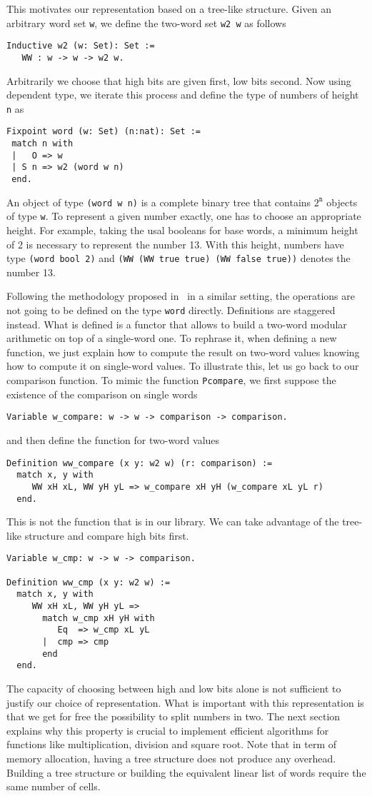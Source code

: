 This motivates our representation based on a tree-like structure. Given an arbitrary word set {\tt w}, we define
the two-word set {\tt w2 w} as follows 
\begin{verbatim}
Inductive w2 (w: Set): Set :=  
   WW : w -> w -> w2 w.
\end{verbatim}
Arbitrarily we choose that high bits are given first, low bits
second. Now using dependent type, we iterate this process and define
the type of numbers of height {\tt n} as
\begin{verbatim}
Fixpoint word (w: Set) (n:nat): Set :=
 match n with
 |   O => w
 | S n => w2 (word w n)
 end.
\end{verbatim}
An object of type {\tt (word w n)} is a complete binary tree that
contains $2^\texttt{n}$ objects of type {\tt w}.
To represent a given number exactly, one has to choose an appropriate height.
For example, taking the usal booleans for base words, a minimum
height of 2 is necessary to represent the number 13. With this height, 
numbers have type {\tt (word bool 2)} and 
{\tt (WW (WW true true) (WW false true))} denotes the number 13.

Following the methodology proposed in~\cite{GreMa} in a similar setting, 
the operations are not going to be defined on the type {\tt word} directly.
Definitions are staggered instead. What is defined is a functor that 
allows to build a two-word modular arithmetic on top of a single-word one. To rephrase it,
when defining a new function, we just explain how to compute the 
result on two-word values knowing how to compute it on single-word values.
To illustrate this, let us go back to our comparison function. 
To mimic the function {\tt Pcompare}, we first suppose the existence
of the comparison on single words
\begin{verbatim}
Variable w_compare: w -> w -> comparison -> comparison.
\end{verbatim}
and then define the function for two-word values
\begin{verbatim}
Definition ww_compare (x y: w2 w) (r: comparison) :=
  match x, y with
     WW xH xL, WW yH yL => w_compare xH yH (w_compare xL yL r) 
  end.
\end{verbatim}
This is not the function that is in our library. We can take 
advantage of the tree-like structure and compare high bits first.  
\begin{verbatim}
Variable w_cmp: w -> w -> comparison.

Definition ww_cmp (x y: w2 w) :=
  match x, y with
     WW xH xL, WW yH yL => 
       match w_cmp xH yH with 
          Eq  => w_cmp xL yL
       |  cmp => cmp
       end
  end. 
\end{verbatim}
The capacity of choosing between high and low bits alone is
not sufficient to justify our choice of representation. What
is important with this representation is that we get for free
the possibility to split numbers in two. The next section 
explains why this property is crucial to implement efficient
algorithms for functions like multiplication, division and square root.
Note that in term of memory allocation, having a tree structure
does not produce any overhead. Building a tree structure or 
building the equivalent linear list of words require the same number of cells.

